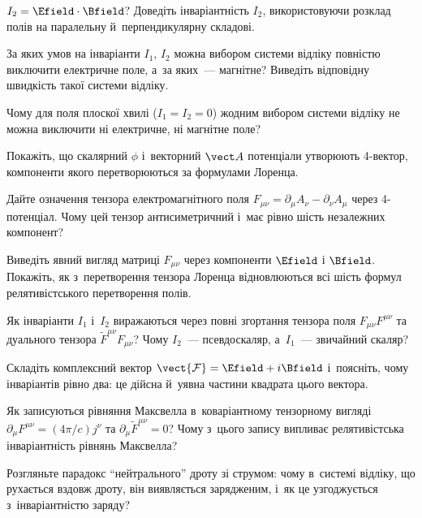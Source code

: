 \begin{Questions}
\begin{quizlist}
	  $I_2=\Efield\cdot\Bfield$? Доведіть інваріантність $I_2$, використовуючи розклад
	  полів на паралельну й~перпендикулярну складові.
	\item За яких умов на інваріанти $I_1$, $I_2$ можна вибором системи відліку повністю
	  виключити електричне поле, а~за яких~--- магнітне? Виведіть відповідну швидкість
	  такої системи відліку.
	\item Чому для поля плоскої хвилі ($I_1=I_2=0$) жодним вибором системи відліку не
	  можна виключити ні електричне, ні магнітне поле?
	\item Покажіть, що скалярний $\phi$ і~векторний $\vect A$ потенціали утворюють
	  4-вектор, компоненти якого перетворюються за формулами Лоренца.
	\item Дайте означення тензора електромагнітного поля $F_{\mu\nu} = \partial_\mu A_\nu
	  - \partial_\nu A_\mu$ через 4-потенціал. Чому цей тензор антисиметричний і~має рівно
	  шість незалежних компонент?
	\item Виведіть явний вигляд матриці $F_{\mu\nu}$ через компоненти $\Efield$ і
	  $\Bfield$. Покажіть, як з~перетворення тензора Лоренца відновлюються всі шість
	  формул релятивістського перетворення полів.
	\item Як інваріанти $I_1$ і~$I_2$ виражаються через повні згортання тензора поля
	  $F_{\mu\nu}F^{\mu\nu}$ та дуального тензора $\tilde F^{\mu\nu}F_{\mu\nu}$? Чому
	  $I_2$~--- псевдоскаляр, а~$I_1$~--- звичайний скаляр?
	\item Складіть комплексний вектор $\vect{\mathcal F} = \Efield + i\Bfield$ і~поясніть,
	  чому інваріантів рівно два: це дійсна й~уявна частини квадрата цього вектора.
	\item Як записуються рівняння Максвелла в~коваріантному тензорному вигляді
	  $\partial_\mu F^{\mu\nu} = (4\pi/c)j^\nu$ та $\partial_\mu\tilde F^{\mu\nu}=0$? Чому
	  з~цього запису випливає релятивістська інваріантність рівнянь Максвелла?
	\item Розгляньте парадокс \enquote{нейтрального} дроту зі струмом: чому в~системі
	  відліку, що рухається вздовж дроту, він виявляється зарядженим, і~як це
	  узгоджується з~інваріантністю заряду?
\end{quizlist}
\end{Questions}

